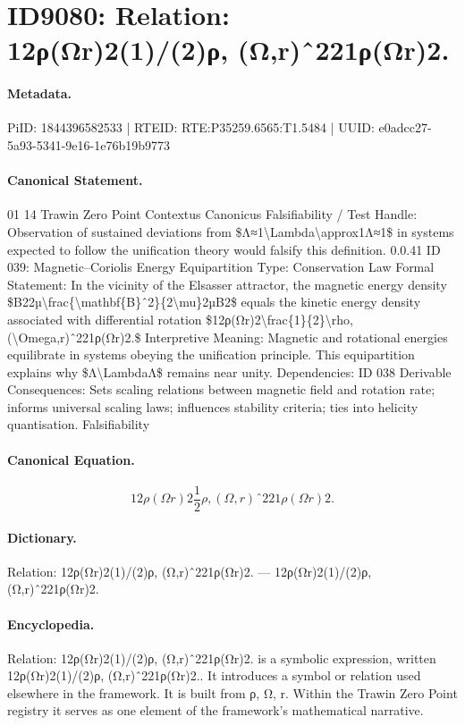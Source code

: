 \section*{ID9080: Relation: 12ρ(Ωr)2(1)/(2)ρ, (Ω,r)ˆ221ρ(Ωr)2.}
\paragraph{Metadata.}
PiID: 1844396582533 | RTEID: RTE:P35259.6565:T1.5484 | UUID: e0adcc27-5a93-5341-9e16-1e76b19b9773

\paragraph{Canonical Statement.}
01 14 Trawin Zero Point Contextus Canonicus Falsifiability / Test Handle: Observation of sustained deviations from \$Λ≈1\textbackslash{}Lambda\textbackslash{}approx1Λ≈1\$ in systems expected to follow the unification theory would falsify this definition. 0.0.41 ID 039: Magnetic–Coriolis Energy Equipartition Type: Conservation Law Formal Statement: In the vicinity of the Elsasser attractor, the magnetic energy density \$B22µ\textbackslash{}frac\{\textbackslash{}mathbf\{B\}ˆ2\}\{2\textbackslash{}mu\}2µB2\$ equals the kinetic energy density associated with differential rotation \$12ρ(Ωr)2\textbackslash{}frac\{1\}\{2\}\textbackslash{}rho, (\textbackslash{}Omega,r)ˆ221ρ(Ωr)2.\$ Interpretive Meaning: Magnetic and rotational energies equilibrate in systems obeying the unification principle. This equipartition explains why \$Λ\textbackslash{}LambdaΛ\$ remains near unity. Dependencies: ID 038 Derivable Consequences: Sets scaling relations between magnetic field and rotation rate; informs universal scaling laws; influences stability criteria; ties into helicity quantisation. Falsifiability

\paragraph{Canonical Equation.}
\[
12ρ(Ωr)2\frac{1}{2}\rho, (\Omega,r)ˆ221ρ(Ωr)2.
\]

\paragraph{Dictionary.}
Relation: 12ρ(Ωr)2(1)/(2)ρ, (Ω,r)ˆ221ρ(Ωr)2. — 12ρ(Ωr)2(1)/(2)ρ, (Ω,r)ˆ221ρ(Ωr)2.

\paragraph{Encyclopedia.}
Relation: 12ρ(Ωr)2(1)/(2)ρ, (Ω,r)ˆ221ρ(Ωr)2. is a symbolic expression, written 12ρ(Ωr)2(1)/(2)ρ, (Ω,r)ˆ221ρ(Ωr)2.. It introduces a symbol or relation used elsewhere in the framework. It is built from ρ, Ω, r. Within the Trawin Zero Point registry it serves as one element of the framework's mathematical narrative.
